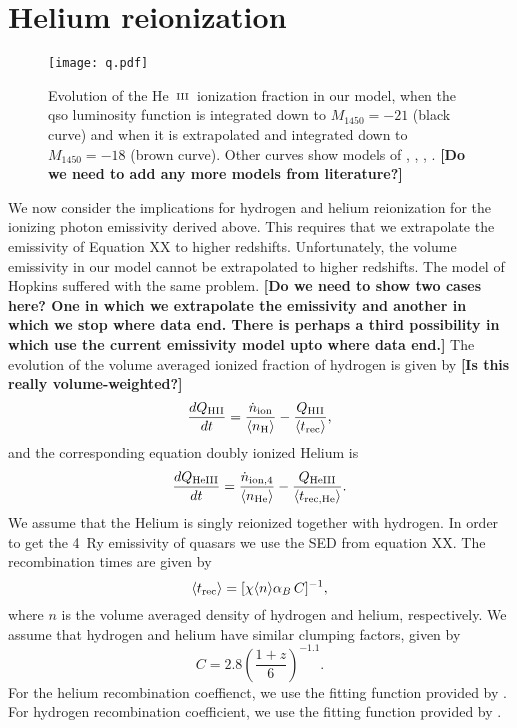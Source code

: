 \documentclass[a4paper,fleqn,usenatbib]{mnras}
\newcommand{\gk}[1]{{\bf \color{notecolor} [#1]}}
\def\nH{{\rm H}}
\def\nHII{{\rm HII}}
\def\nHe{{\rm He}}
\def\nHeIII{{\rm HeIII}}
\def\HeIII{\hbox{He~$\scriptstyle\rm III$}}
\def\HeIII{\hbox{He~$\scriptstyle\rm III$}}
\begin{document}
\section{Helium reionization}

\begin{figure}
  \begin{center}
    \texttt{[image: q.pdf]}
  \end{center}
  \caption{Evolution of the \HeIII\ ionization fraction in our model,
    when the qso luminosity function is integrated down to
    $M_{1450}=-21$ (black curve) and when it is extrapolated and
    integrated down to $M_{1450}=-18$ (brown curve).  Other curves
    show models of \citet[solid grey]{2012ApJ...746..125H},
    \citet[dashed grey]{2015ApJ...813L...8M}, \citet[light blue and
      shaded region]{2016ApJ...828...90L},
    \citet[blue]{2018arXiv180104931P}. \gk{Do we need to add any more
      models from literature?}}
\end{figure}

We now consider the implications for hydrogen and helium reionization
for the ionizing photon emissivity derived above.  This requires that
we extrapolate the emissivity of Equation XX to higher redshifts.
Unfortunately, the volume emissivity in our model cannot be
extrapolated to higher redshifts.  The model of Hopkins suffered with
the same problem.  \gk{Do we need to show two cases here?  One in
  which we extrapolate the emissivity and another in which we stop
  where data end.  There is perhaps a third possibility in which use
  the current emissivity model upto where data end.}  The evolution of
the volume averaged ionized fraction of hydrogen is given by \gk{Is
  this really volume-weighted?}  \citep{2012ApJ...746..125H}
\begin{equation}
{dQ_\nHII\over dt}={\dot n_{\rm ion}\over \langle n_\nH \rangle} -{Q_\nHII\over
\langle t_{\rm rec}\rangle},
\label{eq:qdot}
\end{equation}
and the corresponding equation doubly ionized Helium is
\begin{equation}
{dQ_\nHeIII\over dt}={\dot n_{\rm ion,4}\over \langle n_\nHe \rangle} -{Q_\nHeIII\over
\langle t_{\rm rec,He}\rangle}.
\label{eq:qHedot}
\end{equation}
We assume that the Helium is singly reionized together with hydrogen.
In order to get the 4~Ry emissivity of quasars we use the SED from
equation XX.  The recombination times are given by
\begin{equation}
\langle t_{\rm rec}\rangle=[\chi \langle n\rangle \alpha_B\,C]^{-1},
\label{eq:trec}
\end{equation}
where $n$ is the volume averaged density of hydrogen and helium,
respectively.  We assume that hydrogen and helium have similar
clumping factors, given by \citep{2015ApJ...813L...8M}
\begin{equation}
  C = 2.8\left(\frac{1+z}{6}\right)^{-1.1}.
\end{equation}
For the helium recombination coeffienct, we use the fitting function
provided by \citet{1997MNRAS.292...27H}.  For hydrogen recombination
coefficient, we use the fitting function provided by
\citet{2011piim.book.....D}.
\end{document}

